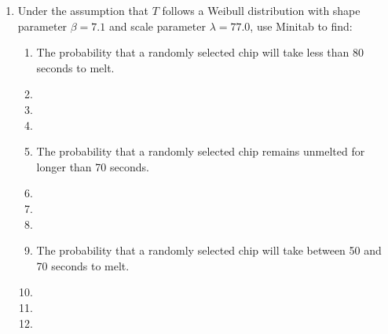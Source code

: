 \begin{enumerate}
\begin{enumerate}
\begin{enumerate}
\item[]
\item[]
\item[]
\end{enumerate}
\item  Under  the assumption that $T$ follows a Weibull distribution with shape parameter $\beta=7.1$ and scale parameter $\lambda=77.0$, use Minitab to find:
\begin{enumerate}
\item The probability that a randomly selected chip will take less than 80 seconds to melt.
\item[]
\item[]
\item[]
\item The probability that a randomly selected chip remains unmelted for longer than 70 seconds.
\item[]
\item[]
\item[]
\item The probability that a randomly selected chip will take between 50 and 70 seconds to melt.
\item[]
\item[]
\item[]
\end{enumerate}
\end{enumerate}



\end{enumerate}
